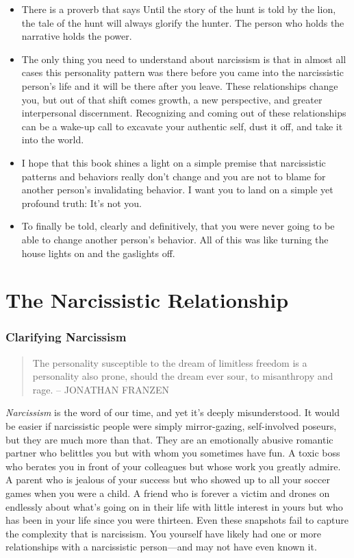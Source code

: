 \documentclass[11pt,letter]{article}
\begin{document}
\begin{itemize}

\item There is a proverb that says Until the story of the hunt is told by the
lion, the tale of the hunt will always glorify the hunter. The person who holds
the narrative holds the power.

\item The only thing you need to understand about narcissism is that in almost
all cases this personality pattern was there before you came into the
narcissistic person’s life and it will be there after you leave. These
relationships change you, but out of that shift comes growth, a new
perspective, and greater interpersonal discernment. Recognizing and coming out
of these relationships can be a wake-up call to excavate your authentic self,
dust it off, and take it into the world.

\item I hope that this book shines a light on a simple premise that
narcissistic patterns and behaviors really don’t change and you are not to
blame for another person’s invalidating behavior. I want you to land on a
simple yet profound truth:   It’s not you. 

\item To finally be told, clearly and definitively, that you were never going
to be able to change another person’s behavior. All of this was like turning
the house lights on and the gaslights off.

\end{itemize}

\part{The Narcissistic Relationship}

\section{Clarifying Narcissism}

\begin{quote}
The personality susceptible to the dream of limitless freedom is a personality
also prone, should the dream ever sour, to misanthropy and rage. \flushright --
JONATHAN FRANZEN
\end{quote}

{\it Narcissism} is the word of our time, and yet it’s deeply misunderstood. It
would be easier if narcissistic people were simply mirror-gazing, self-involved
poseurs, but they are much more than that. They are an emotionally abusive
romantic partner who belittles you but with whom you sometimes have fun. A
toxic boss who berates you in front of your colleagues but whose work you
greatly admire. A parent who is jealous of your success but who showed up to
all your soccer games when you were a child. A friend who is forever a victim
and drones on endlessly about what’s going on in their life with little
interest in yours but who has been in your life since you were thirteen. Even
these snapshots fail to capture the complexity that is narcissism. You yourself
have likely had one or more relationships with a narcissistic person—and may
not have even known it.
\end{document}
